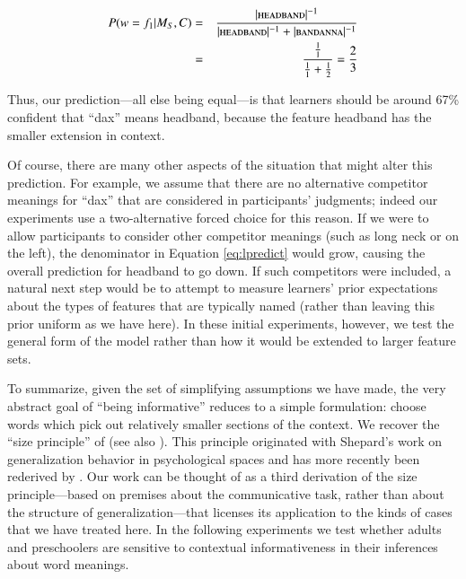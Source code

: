 \documentclass[man,noapacite]{apa2}
\begin{document}
\begin{eqnarray*}
P(w = f_1 | M_S, C) &=& \frac{| \textsc{headband}|^{-1}}{| \textsc{headband}|^{-1} + | \textsc{bandanna}|^{-1}} \\
&=& \frac{\frac{1}{1}}{\frac{1}{1} + \frac{1}{2}} = \frac{2}{3} \\
\end{eqnarray*} 

\noindent Thus, our prediction---all else being equal---is that learners should be around 67\% confident that ``dax'' means {\sc headband}, because the feature {\sc headband} has the smaller extension in context. 

Of course, there are many other aspects of the situation that might alter this prediction. For example, we assume that there are no alternative competitor meanings for ``dax'' that are considered in participants' judgments; indeed our experiments use a two-alternative forced choice for this reason. If we were to allow participants to consider other competitor meanings (such as {\sc long neck} or {\sc on the left}), the denominator in Equation \ref{eq:lpredict} would grow, causing the overall prediction for {\sc headband} to go down. If such competitors were included, a natural next step would be to attempt to measure learners' prior expectations about the types of features that are typically named (rather than leaving this prior uniform as we have here). In these initial experiments, however, we test the general form of the model rather than how it would be extended to larger feature sets.

To summarize, given the set of simplifying assumptions we have made, the very abstract goal of ``being informative'' reduces to a simple formulation: choose words which pick out relatively smaller sections of the context. We recover the ``size principle'' of  (see also ). This principle originated with Shepard's \citeyear{shepard1987} work on generalization behavior in psychological spaces and  has more recently been rederived by . Our work can be thought of as a third derivation of the size principle---based on premises about the communicative task, rather than about the structure of generalization---that licenses its application to the kinds of cases that we have treated here. In the following experiments we test whether adults and preschoolers are sensitive to contextual informativeness in their inferences about word meanings.
\end{document}
